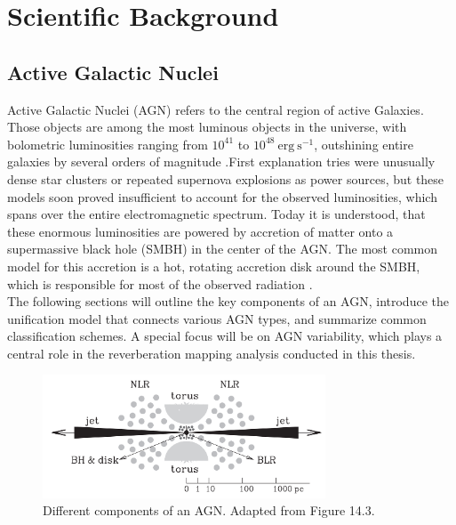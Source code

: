 \chapter{Scientific Background}
\label{chap:scientific_background}

\section{Active Galactic Nuclei}
\label{sec:agn}

Active Galactic Nuclei (AGN) refers to the central region of active Galaxies. Those objects are among the most luminous objects in the universe, with bolometric luminosities ranging from $10^{41}$ to $10^{48} \ \mathrm{erg \ s^{-1}}$, outshining entire galaxies by several orders of magnitude \parencite{peterson1997introduction}.First explanation tries were unusually dense star clusters or repeated supernova explosions as power sources, but these models soon proved insufficient to account for the observed luminosities, which spans over the entire electromagnetic spectrum. Today it is understood, that these enormous luminosities are powered by accretion of matter onto a supermassive black hole (SMBH) in the center of the AGN. The most common model for this accretion is a hot, rotating accretion disk around the SMBH, which is responsible for most of the observed radiation \parencite{shakura1973black}.\\
The following sections will outline the key components of an AGN, introduce the unification model that connects various AGN types, and summarize common classification schemes. A special focus will be on AGN variability, which plays a central role in the reverberation mapping analysis conducted in this thesis.



\begin{figure}[!ht]
	\centering
	\includegraphics[width=0.75\textwidth]{pictures/Chapter2/AGN_standard_paradigm.png}
	\caption{Different components of an AGN. Adapted from \parencite{mo2010galaxy} Figure 14.3.}
	\label{fig:agn_structure_mo}
\end{figure}


